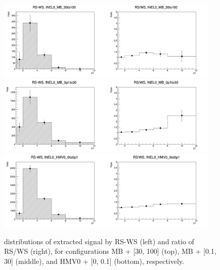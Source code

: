\begin{appendix}
\begin{figure}[h]
    \centering
    \includegraphics[width=0.95\textwidth]{plots/s2_RSdWS_INEL0_MB_30to100.png} \\\vspace{5pt}
    \includegraphics[width=0.95\textwidth]{plots/s2_RSdWS_INEL0_MB_0p1to30.png} \\\vspace{5pt}
    \includegraphics[width=0.95\textwidth]{plots/s2_RSdWS_INEL0_HMV0_0to0p1.png}
    \caption{\pt distributions of extracted signal by RS-WS (left) and ratio of RS/WS (right), for configurations MB + [30, 100] (top), MB + [0.1, 30] (middle), and HMV0 + [0, 0.1] (bottom), respectively.}
    \label{fig:appB_RSWSmd}
\end{figure}
\clearpage


\end{appendix}
